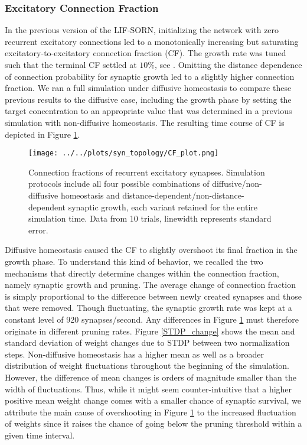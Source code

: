 \documentclass[10pt,a4paper]{article}
\begin{document}
\subsubsection{Excitatory Connection Fraction}
In the previous version of the LIF-SORN, initializing the network with zero recurrent excitatory connections led to a monotonically increasing but saturating excitatory-to-excitatory connection fraction (CF). The growth rate was tuned such that the terminal CF settled at $\mathrm{10\%}$, see \cite[p. 8]{SORN_Paper}. Omitting the distance dependence of connection probability for synaptic growth led to a slightly higher connection fraction. We ran a full simulation under diffusive homeostasis to compare these previous results to the diffusive case, including the growth phase by setting the target concentration to an appropriate value that was determined in a previous simulation with non-diffusive homeostasis. The resulting time course of CF is depicted in Figure \ref{CF_plot}.
\begin{figure}
\texttt{[image: ../../plots/syn\_topology/CF\_plot.png]}
\caption{Connection fractions of recurrent excitatory synapses. Simulation protocols include all four possible combinations of diffusive/non-diffusive homeostasis and distance-dependent/non-distance-dependent synaptic growth, each variant retained for the entire simulation time. Data from 10 trials, linewidth represents standard error.}
\label{CF_plot}
\end{figure}
Diffusive homeostasis caused the CF to slightly overshoot its final fraction in the growth phase. To understand this kind of behavior, we recalled the two mechanisms that directly determine changes within the connection fraction, namely synaptic growth and pruning. The average change of connection fraction is simply proportional to the difference between newly created synapses and those that were removed. Though fluctuating, the synaptic growth rate was kept at a constant level of 920 synapses/second. Any differences in Figure \ref{CF_plot} must therefore originate in different pruning rates. Figure \ref{STDP_change} shows the mean and standard deviation of weight changes due to STDP between two normalization steps. Non-diffusive homeostasis has a higher mean as well as a broader distribution of weight fluctuations throughout the beginning of the simulation. However, the difference of mean changes is orders of magnitude smaller than the width of fluctuations. Thus, while it might seem counter-intuitive that a higher positive mean weight change comes with a smaller chance of synaptic survival, we attribute the main cause of overshooting in Figure \ref{CF_plot} to the increased fluctuation of weights since it raises the chance of going below the pruning threshold within a given time interval.
\end{document}
